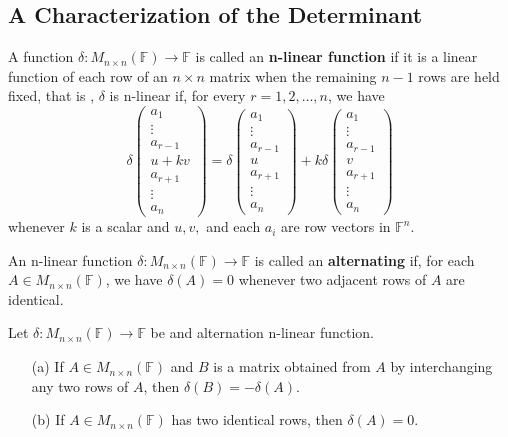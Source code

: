 \subsection{A Characterization of the Determinant}
\begin{definition}
    A function \(\delta: M_{n \times n}(\mathbb{F}) \to \mathbb{F}\) is called an \textbf{n-linear function} if it is a linear function of each row of an \( n \times n \) matrix when the remaining \( n-1\) rows are held fixed, that is , \(\delta\) is n-linear if, for every \(r=1,2,\dots ,n\), we have
    \[
    \delta \begin{pmatrix} a_1 \\ \vdots \\ a_{r-1} \\ u + kv \\ a_{r+1} \\ \vdots \\ a_n \end{pmatrix}
    = \delta \begin{pmatrix} a_1 \\ \vdots \\ a_{r-1} \\ u \\ a_{r+1} \\ \vdots \\ a_n \end{pmatrix}
    + k \delta \begin{pmatrix} a_1 \\ \vdots \\ a_{r-1} \\ v \\ a_{r+1} \\ \vdots \\ a_n \end{pmatrix}
    \]
    whenever \(k\) is a scalar and \(u, v,\) and each \(a_i\) are row vectors in \(\mathbb{F}^n\).
\end{definition}
\begin{definition}
    An n-linear function \(\delta: M_{n \times n}(\mathbb{F}) \to \mathbb{F}\) is called an \textbf{alternating} if, for each \(A \in M_{n \times n}(\mathbb{F})\), we have \(\delta(A) = 0\) whenever two adjacent rows of \(A\) are identical.
\end{definition}
\begin{theorem}
    Let \(\delta: M_{n \times n}(\mathbb{F}) \to \mathbb{F}\) be and alternation n-linear function.
    \begin{enumerate}
        \item[(a)] If \(A \in M_{n \times n}(\mathbb{F})\) and \(B\) is a matrix obtained from \(A\) by interchanging any two rows of \(A\), then \(\delta(B) = - \delta(A)\).
        \item[(b)] If \(A \in M_{n \times n}(\mathbb{F})\) has two identical rows, then \(\delta(A) = 0 \). 
    \end{enumerate}
\end{theorem}
